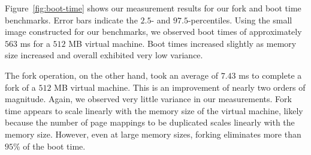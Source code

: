 \begin{figure*}
  \center

  \label{fig:fork-time}
  \hspace{1cm}
  \caption{Time for virtual machine cold start vs. fork}
  \label{fig:boot-time}
\end{figure*}

 Figure~\ref{fig:boot-time} shows our measurement results
for our fork and boot time benchmarks. Error bars indicate the $2.5$- and
$97.5$-percentiles. Using the small image constructed for our benchmarks, we
observed boot times of approximately $563$ ms for a $512$ MB virtual machine.
Boot times increased slightly as memory size increased and overall exhibited
very low variance.

The fork operation, on the other hand, took an average of $7.43$ ms to complete
a fork of a $512$ MB virtual machine. This is an improvement of nearly two
orders of magnitude. Again, we observed very little variance in our
measurements. Fork time appears to scale linearly with the memory size of the
virtual machine, likely because the number of page mappings to be duplicated
scales linearly with the memory size. However, even at large memory sizes,
forking eliminates more than $95$\% of the boot time.

